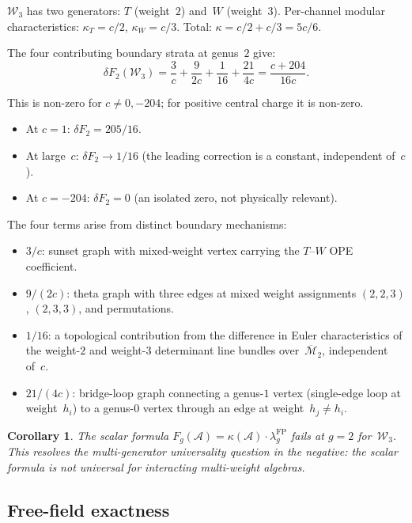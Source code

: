 \documentclass[11pt,reqno]{amsart}
\newtheorem{corollary}[theorem]{Corollary}
\theoremstyle{definition}
\theoremstyle{remark}
\newcommand{\cA}{\mathcal{A}}
\newcommand{\cW}{\mathcal{W}}
\newcommand{\Mbar}{\overline{\mathcal{M}}}
\numberwithin{equation}{section}
\begin{document}
$\cW_3$ has two generators: $T$ (weight~$2$) and~$W$
(weight~$3$). Per-channel modular characteristics:
$\kappa_T = c/2$, $\kappa_W = c/3$. Total:
$\kappa = c/2 + c/3 = 5c/6$.

The four contributing boundary strata at genus~$2$ give:
\begin{equation}\label{eq:w3-cross}
\delta F_2(\cW_3) = \frac{3}{c} + \frac{9}{2c}
+ \frac{1}{16} + \frac{21}{4c}
= \frac{c + 204}{16c}.
\end{equation}

This is non-zero for $c\ne0,-204$; for positive central charge it is
non-zero.

\begin{itemize}
\item At $c = 1$: $\delta F_2 = 205/16$.
\item At large~$c$: $\delta F_2 \to 1/16$ (the leading
 correction is a constant, independent of~$c$).
\item At $c = -204$: $\delta F_2 = 0$ (an isolated zero,
 not physically relevant).
\end{itemize}

The four terms arise from distinct boundary mechanisms:
\begin{itemize}
\item $3/c$: sunset graph with mixed-weight vertex carrying
 the $T$--$W$ OPE coefficient.
\item $9/(2c)$: theta graph with three edges at mixed weight
 assignments $(2,2,3)$, $(2,3,3)$, and permutations.
\item $1/16$: a topological contribution from the difference
 in Euler characteristics of the weight-$2$ and weight-$3$
 determinant line bundles over~$\Mbar_2$, independent of~$c$.
\item $21/(4c)$: bridge-loop graph connecting a genus-$1$
 vertex (single-edge loop at weight~$h_i$) to a genus-$0$
 vertex through an edge at weight~$h_j \neq h_i$.
\end{itemize}

\begin{corollary}\label{cor:scalar-fails}
The scalar formula $F_g(\cA) = \kappa(\cA)\cdot
\lambda_g^{\mathrm{FP}}$ fails at $g = 2$ for~$\cW_3$.
This resolves the multi-generator universality question
in the negative: the scalar formula is not universal for
interacting multi-weight algebras.
\end{corollary}

\subsection{Free-field exactness}
\end{document}
